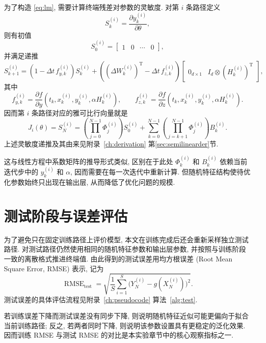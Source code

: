     为了构造 \eqref{eq:lm}, 需要计算终端残差对参数的灵敏度.
    对第 $i$ 条路径定义
    \begin{equation}
      S_{k}^{(i)} = \frac{\partial y_{k}^{(i)}}{\partial \theta},
      \label{eq:Sk}
    \end{equation}
    则有初值
    \begin{equation}
      S_{0}^{(i)} =
      \begin{bmatrix}
        1 & 0 & \cdots & 0
      \end{bmatrix},
      \label{eq:S0}
    \end{equation}
    并满足递推
    \begin{equation}
      S_{k+1}^{(i)}
      =
      \left(1-\Delta t\, f_{y,k}^{(i)}\right)S_k^{(i)}
      +
      \left((\Delta W_k^{(i)})^{\operatorname{T}}
        -\Delta t\, f_{z,k}^{(i)}\right)
      \begin{bmatrix}
        0_{d\times 1} & I_d \otimes (H_k^{(i)})^{\operatorname{T}}
      \end{bmatrix},
      \label{eq:srecurrence}
    \end{equation}
    其中
    \begin{equation}
      f_{y,k}^{(i)} = \frac{\partial f}{\partial y} (t_{k}, x_{k}^{(i)}, y_{k}^{(i)}, \alpha H_{k}^{(i)}),
      \qquad
      f_{z,k}^{(i)} = \frac{\partial f}{\partial z} (t_{k}, x_{k}^{(i)}, y_{k}^{(i)}, \alpha H_{k}^{(i)}).
      \label{eq:fyfz}
    \end{equation}
    因而第 $i$ 条路径对应的雅可比行向量就是
    \begin{equation}
      J_{i}(\theta) = S_{N}^{(i)}
      = (\prod_{j = 0}^{N - 1} \Phi_{j}^{(i)}) S_{0}^{(i)} +
      \sum_{k=0}^{N-1} ( \prod_{j =k + 1}^{N - 1} \Phi_j^{(i)}) B_{k}^{(i)}.
      \label{eq:jacobian4i}
    \end{equation}
    上述灵敏度递推及其由来见附录~\ref{ch:derivation} 第\ref{sec:semilinearder}节.

    这与线性方程中系数矩阵的推导形式类似,
    区别在于此处 $\Phi_{k}^{(i)}$ 和 $B_{k}^{(i)}$ 依赖当前迭代步中的 $y_{k}^{(i)}$ 和 $\alpha$,
    因而需要在每一次迭代中重新计算.
    但随机特征结构使待优化参数始终只出现在输出层,
    从而降低了优化问题的规模.

  \section{测试阶段与误差评估}\label{sec:test&eval}
    为了避免只在固定训练路径上评价模型, 本文在训练完成后还会重新采样独立测试路径.
    对测试路径仍然使用相同的随机特征参数和输出层参数,
    并按照与训练阶段一致的离散格式推进终端值.
    由此得到的测试误差用均方根误差 (Root Mean Square Error, RMSE) 表示, 记为
    \begin{equation*}
      \operatorname{RMSE}_{\text{test}}
      =
      \sqrt{
        \frac{1}{S}
        \sum_{i = 1}^{S}
        \bigl(
        Y_{N}^{(i)} - g(X_{N}^{(i)})
        \bigr)^{2}
      }.
    \end{equation*}
    测试误差的具体评估流程见附录~\ref{ch:pseudocode} 算法~\ref{alg:test}.

    若训练误差下降而测试误差没有同步下降, 则说明随机特征近似可能更偏向于拟合当前训练路径;
    反之, 若两者同时下降, 则说明该参数设置具有更稳定的泛化效果.
    因而训练 RMSE 与测试 RMSE 的对比是本实验章节中的核心观察指标之一.
